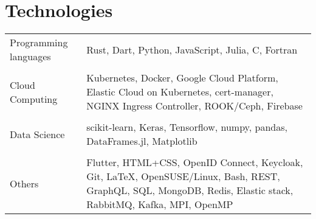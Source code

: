 \documentclass[10pt]{article}
\begin{document}
\section*{Technologies}

\begin{tabu} to \linewidth {lX}
Programming languages
& Rust, Dart, Python, JavaScript, Julia, C, Fortran \\
&\\
Cloud Computing
& Kubernetes, Docker, Google Cloud Platform, Elastic Cloud on
  Kubernetes, cert-manager, NGINX Ingress Controller, ROOK/Ceph, Firebase \\
&\\
Data Science
& scikit-learn, Keras, Tensorflow, numpy, pandas, DataFrames.jl,
  Matplotlib \\
&\\
Others
& Flutter, HTML+CSS, OpenID Connect, Keycloak, Git, {\LaTeX},
  OpenSUSE/Linux, Bash, REST, GraphQL, SQL, MongoDB, Redis, Elastic stack,
  RabbitMQ, Kafka, MPI, OpenMP \\
\end{tabu}
\end{document}
